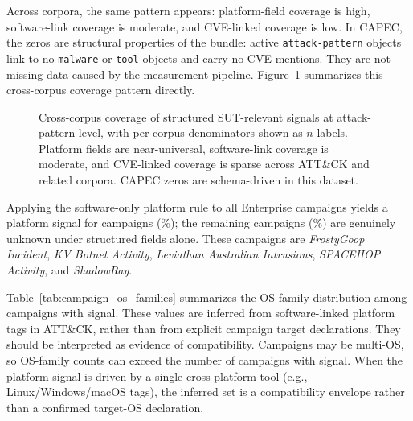 \documentclass[sigconf]{acmart}
\newcommand{\attack}{ATT\&CK\xspace}
\begin{document}
Across corpora, the same pattern appears: platform-field coverage is high, software-link coverage is moderate, and CVE-linked coverage is low. In CAPEC, the zeros are structural properties of the bundle: active \texttt{attack-pattern} objects link to no \texttt{malware} or \texttt{tool} objects and carry no CVE mentions. They are not missing data caused by the measurement pipeline. Figure~\ref{fig:coverage_cross_corpus} summarizes this cross-corpus coverage pattern directly.

\begin{figure}[!tb]
\centering
\resizebox{\columnwidth}{!}{}
\caption{\label{fig:coverage_cross_corpus}Cross-corpus coverage of structured SUT-relevant signals at attack-pattern level, with per-corpus denominators shown as $n$ labels. Platform fields are near-universal, software-link coverage is moderate, and CVE-linked coverage is sparse across ATT\&CK and related corpora. CAPEC zeros are schema-driven in this dataset.}
\end{figure}

Applying the software-only platform rule to all \enterpriseactivecampaigncount{} Enterprise campaigns yields a platform signal for \enterprisecampaignswithplatformsignalcount{} campaigns (\enterprisecampaignswithplatformsignalpct\%); the remaining \enterprisecampaignsplatformunknowncount{} campaigns (\enterprisecampaignsplatformunknownpct\%) are genuinely unknown under structured fields alone. These campaigns are \emph{FrostyGoop Incident}, \emph{KV Botnet Activity}, \emph{Leviathan Australian Intrusions}, \emph{SPACEHOP Activity}, and \emph{ShadowRay}.

Table~\ref{tab:campaign_os_families} summarizes the OS-family distribution among campaigns with signal. These values are inferred from software-linked platform tags in \attack{}, rather than from explicit campaign target declarations. They should be interpreted as evidence of compatibility. Campaigns may be multi-OS, so OS-family counts can exceed the number of campaigns with signal. When the platform signal is driven by a single cross-platform tool (e.g., Linux/Windows/macOS tags), the inferred set is a compatibility envelope rather than a confirmed target-OS declaration.
\end{document}
